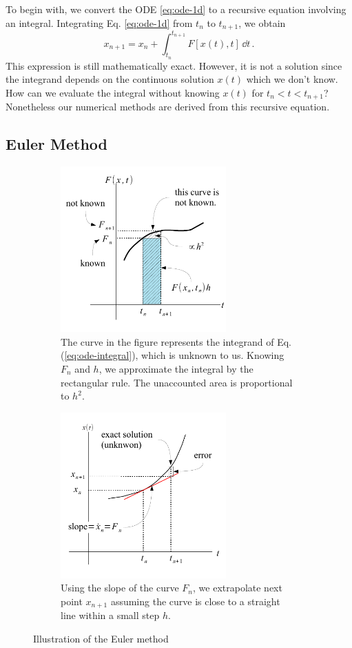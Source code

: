 To begin with, we convert the ODE \eqref{eq:ode-1d} to a recursive equation involving an integral.  Integrating Eq. \eqref{eq:ode-1d} from $t_n$ to $t_{n+1}$, we obtain
\begin{equation}\label{eq:ode-integral}
x_{n+1} = x_n + \int_{t_n}^{t_{n+1}} F[x(t),t]\, \dd{t}\, .
\end{equation}
This expression is still mathematically exact.  However, 
it is not a solution since the integrand depends on the continuous solution $x(t)$ which we don't know.  How can we evaluate the integral without knowing $x(t)$ for $t_n < t < t_{n+1}$? Nonetheless our numerical methods are derived from this recursive equation.  

\subsection{Euler Method}\label{sec:Euler}

\begin{figure}
	\begin{subfigure}{0.45\textwidth}
		\centering
		\includegraphics[width=2.5in]{05.ode1/euler-integral.pdf}
\caption{The curve in the figure represents the integrand of Eq. (\ref{eq:ode-integral}), which is unknown to us. Knowing $F_n$ and $h$, we approximate the integral by the rectangular rule.  The unaccounted area is proportional to $h^2$.}
\label{fig:euler-integral}
	\end{subfigure}
	\begin{subfigure}{0.45\textwidth}
		\centering 
		\includegraphics[width=2.5in]{05.ode1/euler-x.pdf}
\caption{Using the slope of the curve $F_n$,  we extrapolate next point $x_{n+1}$ assuming the curve is close to a straight line within a small step $h$.}
\label{fig:euler-x}
\end{subfigure}
\caption{Illustration of the Euler method}
\label{fig:euler-rule}
\end{figure}

